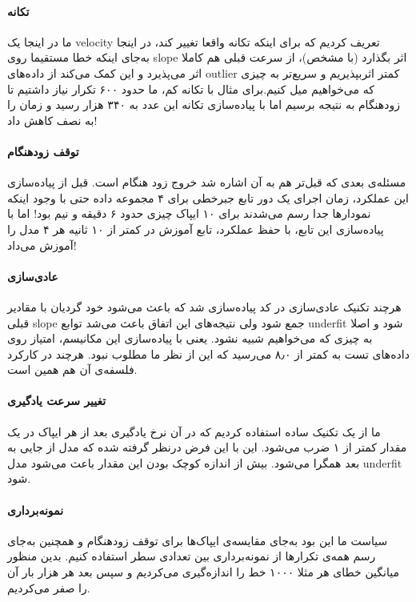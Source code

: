 \documentclass[11pt, a4paper, oneside]{book}
\begin{document}
\paragraph{تکانه}
 ما در اینجا یک velocity تعریف کردیم که برای اینکه تکانه واقعا تغییر کند، در اینجا به‌جای اینکه خطا مستقیما روی slope اثر بگذارد (با  مشخص)، از سرعت قبلی هم کاملا اثر می‌پذیرد و این کمک می‌کند از داده‌های outlier کمتر اثربپذیریم و سریع‌تر به چیزی که می‌خواهیم میل کنیم.برای مثال با تکانه کم، ما حدود ۶۰۰ تکرار نیاز داشتیم تا زودهنگام به نتیجه برسیم اما با پیاده‌سازی تکانه این عدد به ۳۴۰ هزار رسید و زمان را به نصف کاهش داد!
 \paragraph{توقف زودهنگام}
مسئله‌ی بعدی که قبل‌تر هم به آن اشاره شد خروج زود هنگام است. قبل از پیاده‌سازی این عملکرد، زمان اجرای یک دور تابع جبرخطی برای ۴ مجموعه داده حتی با وجود اینکه نمودارها جدا رسم می‌شدند برای ۱۰ ایپاک چیزی حدود ۶ دقیقه و نیم بود! اما با پیاده‌سازی این تابع، با حفظ عملکرد، تابع آموزش در کمتر از ۱۰ ثانیه هر ۴ مدل را آموزش می‌داد!
\paragraph{عادی‌سازی}
هرچند تکنیک عادی‌سازی 
 \href{https://medium.com/@alejandro.itoaramendia/l1-and-l2-regularization-part-2-a-complete-guide-0b16b4ab79ce}{ }
در کد پیاده‌سازی شد که باعث می‌شود خود گردیان با مقادیر قبلی slope جمع شود ولی نتیجه‌های این اتفاق باعث می‌شد توابع underfit شود و اصلا به چیزی که می‌خواهیم شبیه نشود. یعنی با پیاده‌سازی این مکانیسم، امتیاز
روی داده‌های تست به کمتر از ۸٫۰ می‌رسید که این از نظر ما مطلوب نبود. هرچند در کارکرد فلسفه‌ی آن هم همین است.
\paragraph{تغییر سرعت یادگیری}
ما  از یک تکنیک ساده استفاده کردیم که در آن نرخ یادگیری بعد از هر ایپاک در یک مقدار کمتر از ۱ ضرب می‌شود. این با این فرض درنظر گرفته شده که مدل از جایی به بعد همگرا می‌شود. بیش از اندازه کوچک بودن این مقدار باعث می‌شود مدل underfit شود.
\paragraph{نمونه‌برداری}
سیاست ما این بود به‌جای مقایسه‌ی ایپاک‌ها برای توقف زودهنگام و همچنین به‌جای رسم همه‌ی تکرارها از نمونه‌برداری بین  تعدادی سطر استفاده کنیم. بدین منظور میانگین خطای هر مثلا ۱۰۰۰ خط را اندازه‌گیری می‌کردیم و سپس بعد هر هزار بار آن را صفر می‌کردیم.
\end{document}
